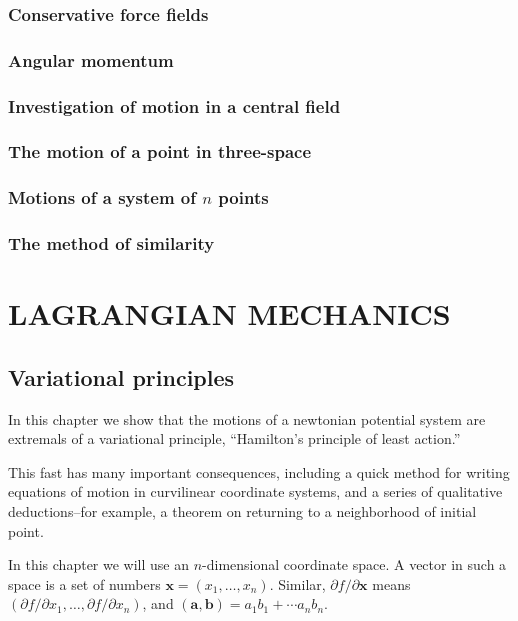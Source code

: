 \documentclass[leqno]{book}
\numberwithin{equation}{section}
\theoremstyle{plain}
\theoremstyle{definition}
\theoremstyle{remark}
\theoremstyle{smallcap}
\numberwithin{prob}{section}
\begin{document}
\section{Conservative force fields}

\section{Angular momentum}

\section{Investigation of motion in a central field}

\section{The motion of a point in three-space}

\section{Motions of a system of $n$ points}

\section{The method of similarity}

\part{LAGRANGIAN MECHANICS}

\chapter{Variational principles}

In this chapter we show that the motions
of a newtonian potential system are extremals
of a variational principle,
``Hamilton's principle of least action.''

This fast has many important consequences,
including a quick method for writing equations
of motion in curvilinear coordinate systems,
and a series of qualitative deductions--for example,
a theorem on returning to a neighborhood of initial point.

In this chapter we will use an $n$-dimensional coordinate space.
%
A vector in such a space is a set of numbers
$\mathbf x = (x_1, \dots, x_n)$.
Similar,
$\partial f/\partial \mathbf x$
means
$(\partial f/\partial x_1, \dots, \partial f/\partial x_n)$,
and
$(\mathbf a, \mathbf b) = a_1 b_1 + \cdots a_n b_n$.
\end{document}
